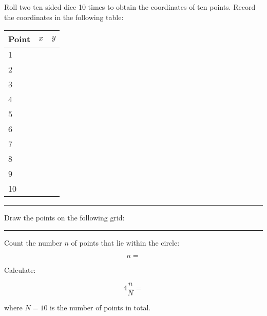 \documentclass{article}
\begin{document}
Roll two ten sided dice 10 times to obtain the coordinates of ten points.
Record the coordinates in the following table:

    \begin{center}
        \begin{tabular}{lcc}
            \toprule
            Point&$x$&$y$\\
            \midrule
            1&&\\
            2&&\\
            3&&\\
            4&&\\
            5&&\\
            6&&\\
            7&&\\
            8&&\\
            9&&\\
            10&&\\
            \bottomrule
        \end{tabular}
    \end{center}

\rule{\textwidth}{.2pt}

Draw the points on the following grid:\\

    \begin{center}
    \end{center}

\rule{\textwidth}{.2pt}

Count the number $n$ of points that lie within the {\color{red}{red}} circle:

    $$n = $$

Calculate:

    $$4\frac{n}{N}=$$

where $N=10$ is the number of points in total.
\end{document}
